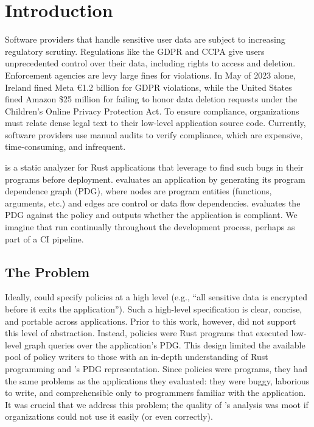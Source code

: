 \chapter{Introduction}
\label{sec:intro}


Software providers that handle sensitive user data are subject to increasing regulatory scrutiny.
%
Regulations like the GDPR and CCPA give users unprecedented control over their data, including rights to access and deletion.
%
Enforcement agencies are levy large fines for violations.
%
In May of 2023 alone, Ireland fined Meta €1.2 billion for GDPR violations, 
while the United States fined Amazon \$25 million for failing to honor data deletion requests under the Children’s Online Privacy Protection Act.\cite{todo}
To ensure compliance, organizations must relate dense legal text to their low-level application source code.
%
Currently, software providers use manual audits to verify compliance, which are expensive, time-consuming,
and infrequent.~\cite{todo}

\sys{} is a static analyzer for Rust applications that \devs{} leverage to find such bugs in their programs before deployment.
%
\sys{} evaluates an application by generating its program dependence graph (PDG), 
where nodes are program entities (functions, arguments, etc.) and edges are control or data flow dependencies.
%
\sys{} evaluates the PDG against the policy and outputs whether the application is compliant.
%
We imagine that \devs{} run \sys{} continually throughout the development process, perhaps as part of a CI pipeline.

\section{The Problem}
Ideally, \writers{} could specify policies at a high level (e.g., ``all sensitive data is encrypted before it exits the application'').
%
Such a high-level specification is clear, concise, and portable across applications.
%
Prior to this work, however, \sys{} did not support this level of abstraction.
%
Instead, policies were Rust programs that executed low-level graph queries over the application's PDG.
%
This design limited the available pool of policy writers to those with an in-depth understanding of Rust programming and \sys{}'s PDG representation.
%
Since policies were programs, they had the same problems as the applications they evaluated: 
they were buggy, laborious to write, and comprehensible only to programmers familiar with the application.
%
It was crucial that we address this problem; the quality of \sys's analysis was moot if organizations could not use it easily (or even correctly).

